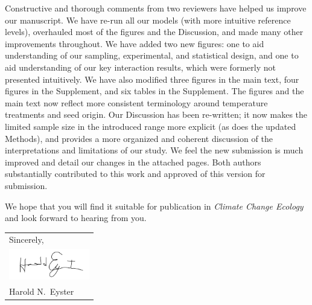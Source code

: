 \documentclass[11pt]{article}
\begin{document}
	Constructive and thorough comments from two reviewers have helped us improve our manuscript. We have re-run all our models (with more intuitive reference levels),  overhauled most of the figures and the Discussion, and made many other improvements throughout. We have added two new figures: one to aid understanding of our sampling, experimental, and statistical design, and one to aid understanding of our key interaction results, which were formerly not presented intuitively. We have also modified three figures in the main text, four figures in the Supplement, and six tables in the Supplement. The figures and the main text now reflect more consistent terminology around temperature treatments and seed origin. Our Discussion has been re-written; it now makes the limited sample size in the introduced range more explicit (as does the updated Methods), and provides a more organized and coherent discussion of the interpretations and limitations of our study. We feel the new submission is much improved and detail our changes in the attached pages. Both authors substantially contributed to this work and approved of this version for submission.  

We hope that you will find it suitable for publication in \textit{Climate Change Ecology} and look forward to hearing from you. \\  %
	\null\hfill
	\begin{tabular}{l@{}}
		Sincerely, \\[1\normalbaselineskip] %
		\includegraphics[width=100pt]{sig}\\
		Harold N.\ Eyster
	\end{tabular}
	
\end{document}

